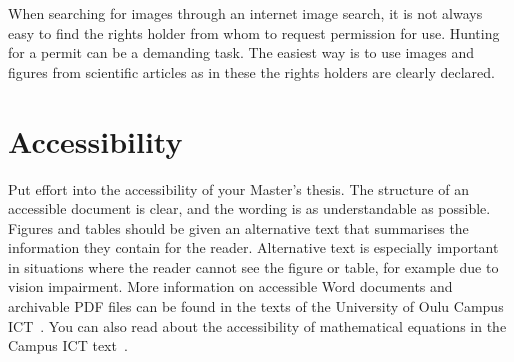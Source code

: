 When searching for images through an internet image search, it is not always easy to find the rights holder from whom to request permission for use. Hunting for a permit can be a demanding task. The easiest way is to use images and figures from scientific articles as in these the rights holders are clearly declared.

\section{Accessibility}
\label{accessibility}
Put effort into the accessibility of your Master’s thesis. The
structure of an accessible document is clear, and the wording is as
understandable as possible. Figures and tables should be given an
alternative text that summarises the information they contain for the
reader. Alternative text is especially important in situations where
the reader cannot see the figure or table, for example due to vision
impairment.  More information on accessible Word documents and
archivable PDF files can be found in the texts of the University of
Oulu Campus ICT~\cite{ictaccessibleword,ictwordpdfa}. You can also
read about the accessibility of mathematical equations in the Campus
ICT text~\cite{ictaccessiblemath}.

